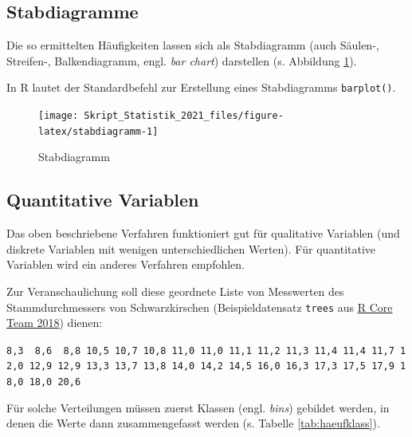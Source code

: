 \documentclass[
  11pt,
  ngerman,
  a4paper,
]{report}
\newenvironment{rtip}{
  \medskip
  \begin{tcolorbox}[colframe=purple,colback=light_gray,title=Softwarehinweis]
}{
  \end{tcolorbox}
  \medskip
}
\begin{document}
\hypertarget{stabdiagramme}{%
\subsection{Stabdiagramme}\label{stabdiagramme}}

Die so ermittelten Häufigkeiten lassen sich als Stabdiagramm (auch Säulen-, Streifen-, Balkendiagramm, engl. \emph{bar chart}) darstellen (s. Abbildung \ref{fig:stabdiagramm}).

\begin{rtip}
In R lautet der Standardbefehl zur Erstellung eines Stabdiagramms \verb|barplot()|.
\end{rtip}

\begin{figure}[!h]

{\centering \texttt{[image: Skript\_Statistik\_2021\_files/figure-latex/stabdiagramm-1]} 

}

\caption{Stabdiagramm}\label{fig:stabdiagramm}
\end{figure}

\hypertarget{quantitative-variablen-1}{%
\subsection{Quantitative Variablen}\label{quantitative-variablen-1}}

Das oben beschriebene Verfahren funktioniert gut für qualitative Variablen (und diskrete Variablen mit wenigen unterschiedlichen Werten). Für quantitative Variablen wird ein anderes Verfahren empfohlen.

Zur Veranschaulichung soll diese geordnete Liste von Messwerten des Stammdurchmessers von Schwarzkirschen (Beispieldatensatz \texttt{trees} aus \protect\hyperlink{ref-r}{R Core Team 2018}) dienen:

\texttt{8,3\ \ 8,6\ \ 8,8\ 10,5\ 10,7\ 10,8\ 11,0\ 11,0\ 11,1\ 11,2\ 11,3\ 11,4\ 11,4\ 11,7\ 12,0\ 12,9\ 12,9\ 13,3\ 13,7\ 13,8\ 14,0\ 14,2\ 14,5\ 16,0\ 16,3\ 17,3\ 17,5\ 17,9\ 18,0\ 18,0\ 20,6}

Für solche Verteilungen müssen zuerst Klassen (engl. \emph{bins}) gebildet werden, in denen die Werte dann zusammengefasst werden (s. Tabelle \ref{tab:haeufklass}).
\end{document}
